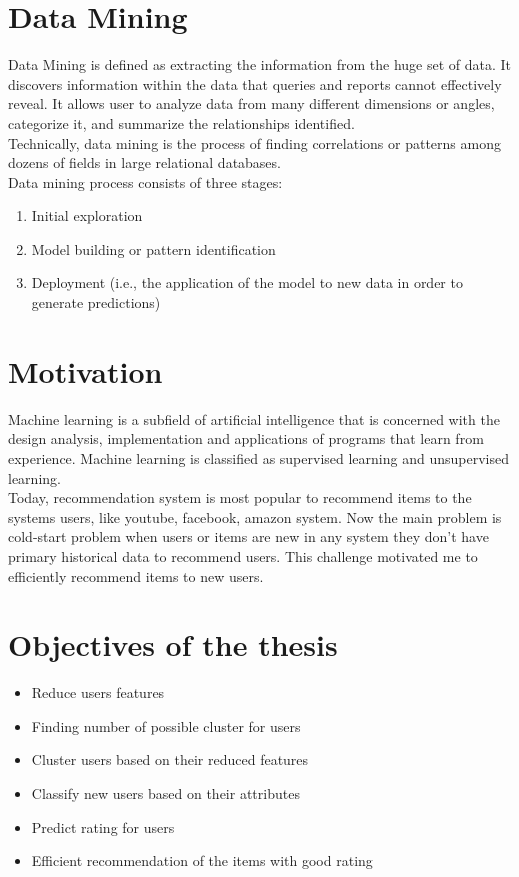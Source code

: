 \documentclass[document.tex]{subfiles}
\begin{document}
\section{Data Mining}
Data Mining is defined as extracting the information from the huge set of data. It discovers information within the data that queries and reports cannot effectively reveal. It allows user to analyze data from many different dimensions or angles, categorize it, and summarize the relationships identified.\\
Technically, data mining is the process of finding correlations or patterns among dozens of fields in large relational databases.\\
Data mining process consists of three stages:\\
\begin{enumerate}
	\item Initial exploration
	\item Model building or pattern identification
	\item Deployment (i.e., the application of the model to new data in order to generate predictions)
\end{enumerate}

\section{Motivation}
Machine learning is a subfield of artificial intelligence that is concerned with the design analysis, implementation and applications of programs that learn from experience. Machine learning is classified as supervised learning and unsupervised learning.\\ 
Today, recommendation system is most popular to recommend items to the systems users, like youtube, facebook, amazon system. Now the main problem is cold-start problem when users or items are new in any system they don’t have primary historical data to recommend users. This challenge motivated me to efficiently recommend items to new users.
\section{Objectives of the thesis}
\begin{itemize}
	\item Reduce users features
	\item Finding number of possible cluster for users
	\item Cluster users based on their reduced features
	\item Classify new users based on their attributes
	\item Predict rating for users
	\item Efficient recommendation of the items with good rating 
\end{itemize}
\end{document}
